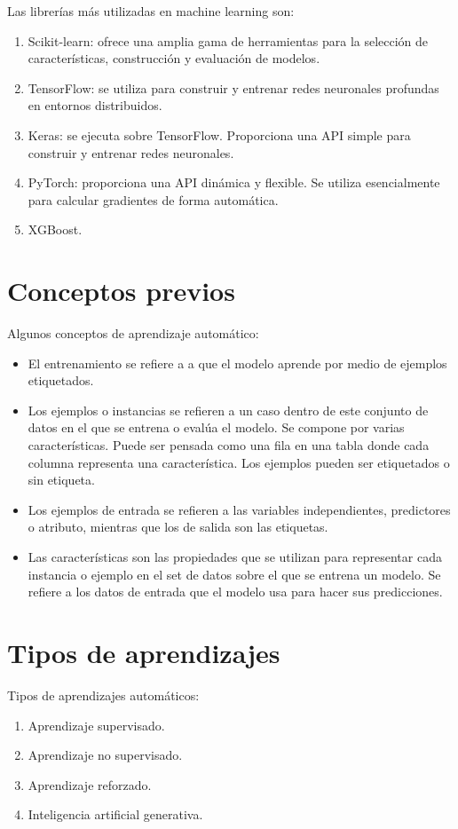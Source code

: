 \documentclass[a4paper, 12pt]{book}
\begin{document}
Las librerías más utilizadas en machine learning son:
\begin{enumerate}
	\item Scikit-learn: ofrece una amplia gama de herramientas para la selección de características, construcción y evaluación de modelos.
	\item TensorFlow: se utiliza para construir y entrenar redes neuronales profundas en entornos distribuidos.
	\item Keras: se ejecuta sobre TensorFlow. Proporciona una API simple para construir y entrenar redes neuronales.
	\item PyTorch: proporciona una API dinámica y flexible. Se utiliza esencialmente para calcular gradientes de forma automática.
	\item XGBoost.
\end{enumerate}

\section{Conceptos previos}
Algunos conceptos de aprendizaje automático:
\begin{itemize}
	\item El entrenamiento se refiere a a que el modelo aprende por medio de ejemplos etiquetados.
	\item Los ejemplos o instancias se refieren a un caso dentro de este conjunto de datos en el que se entrena o evalúa el modelo. Se compone por varias características. Puede ser pensada como una fila en una tabla donde cada columna representa una característica. Los ejemplos pueden ser etiquetados o sin etiqueta.
	\item Los ejemplos de entrada se refieren a las variables independientes, predictores o atributo, mientras que los de salida son las etiquetas.
	\item Las características son las propiedades que se utilizan para representar cada instancia o ejemplo en el set de datos sobre el que se entrena un modelo. Se refiere a los datos de entrada que el modelo usa para hacer sus predicciones.
\end{itemize}

\section{Tipos de aprendizajes}
Tipos de aprendizajes automáticos:
\begin{enumerate}
	\item Aprendizaje supervisado.
	\item Aprendizaje no supervisado.
	\item Aprendizaje reforzado.
	\item Inteligencia artificial generativa.
\end{enumerate}
\end{document}
